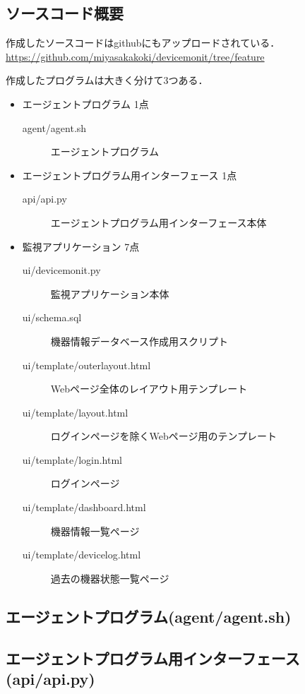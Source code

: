 \subsection{ソースコード概要}
作成したソースコードはgithubにもアップロードされている．
\url{https://github.com/miyasakakoki/devicemonit/tree/feature}

作成したプログラムは大きく分けて3つある．
\begin{itemize}
\item エージェントプログラム 1点\\
	\begin{description}
		\item[agent/agent.sh] エージェントプログラム
	\end{description}
\item エージェントプログラム用インターフェース 1点\\
	\begin{description}
		\item[api/api.py] エージェントプログラム用インターフェース本体
	\end{description}
\item 監視アプリケーション 7点\\
	\begin{description}
		\item[ui/devicemonit.py] 監視アプリケーション本体
		\item[ui/schema.sql] 機器情報データベース作成用スクリプト
		\item[ui/template/outerlayout.html] Webページ全体のレイアウト用テンプレート
		\item[ui/template/layout.html] ログインページを除くWebページ用のテンプレート
		\item[ui/template/login.html] ログインページ
		\item[ui/template/dashboard.html] 機器情報一覧ページ
		\item[ui/template/devicelog.html] 過去の機器状態一覧ページ
	\end{description}
\end{itemize}

\subsection{エージェントプログラム(agent/agent.sh)}

\subsection{エージェントプログラム用インターフェース(api/api.py)}

